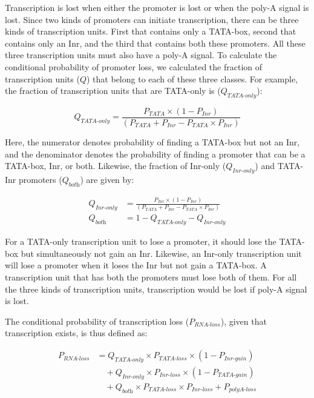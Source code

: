 \documentclass[12pt,a4paper]{article}
\begin{document}
Transcription is lost when either the promoter is lost or when the poly-A signal is lost. Since two kinds of promoters can initiate transcription, there can be three kinds of transcription units. First that contains only a TATA-box, second that contains only an Inr, and the third that contains both these promoters. All these three transcription units must also have a poly-A signal. To calculate the conditional probability of promoter loss, we calculated the fraction of transcription units ($Q$) that belong to each of these three classes. For example, the fraction of transcription units that are TATA-only is ($Q_\textit{TATA-only}$):

\begin{equation*}
Q_\textit{TATA-only} = \frac{P_\textit{TATA}\times(1 - P_\textit{Inr})}{(P_\textit{TATA} + P_\textit{Inr} - P_\textit{TATA}\times P_\textit{Inr})}
\end{equation*}

\vspace{1ex}

Here, the numerator denotes probability of finding a TATA-box but not an Inr, and the denominator denotes the probability of finding a promoter that can be a TATA-box, Inr, or both. Likewise, the fraction of Inr-only ($Q_\textit{Inr-only}$) and TATA-Inr promoters ($Q_\textit{both}$) are given by:

\begin{align*}
Q_\textit{Inr-only} & = \frac{P_\textit{Inr}\times(1 - P_\textit{Inr})}{(P_\textit{TATA} + P_\textit{Inr} - P_\textit{TATA}\times P_\textit{Inr})} \\[1ex]
Q_\textit{both} & = 1 - Q_\textit{TATA-only} -Q_\textit{Inr-only}
\end{align*}

For a TATA-only transcription unit to lose a promoter, it should lose the TATA-box but simultaneously not gain an Inr. Likewise, an Inr-only transcription unit will lose a promoter when it loses the Inr but not gain a TATA-box. A transcription unit that has both the promoters must lose both of them. For all the three kinds of transcription units, transcription would be lost if poly-A signal is lost.

The conditional probability of transcription loss ($P_\textit{RNA-loss}$), given that transcription exists, is thus defined as:

\begin{align}
P_\textit{RNA-loss} & = Q_\textit{TATA-only} \times P_\textit{TATA-loss}\times(1-P_\textit{Inr-gain}) \nonumber\\[1pt]
 & \quad + Q_\textit{Inr-only}\times P_\textit{Inr-loss}\times(1-P_\textit{TATA-gain}) \nonumber \\[1pt]
 & \quad + Q_\textit{both}\times P_\textit{TATA-loss} \times P_\textit{Inr-loss} + P_\textit{polyA-loss}
\label{eqrnaloss}
\end{align}
\end{document}
